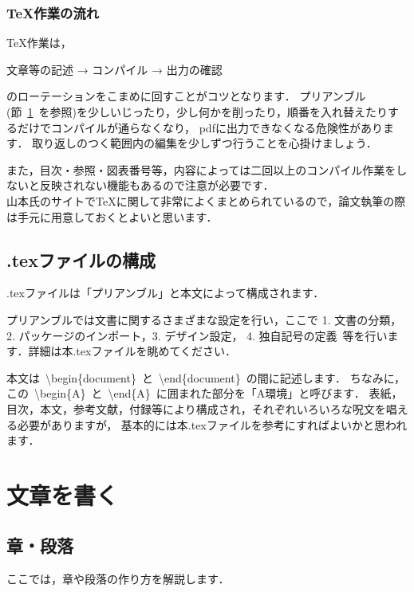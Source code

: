 \documentclass[11pt,a4j,onecolumn]{jsreport} %
\begin{document}
\subsection{TeX作業の流れ}

TeX作業は，
\begin{center}
  文章等の記述 → コンパイル → 出力の確認
\end{center}
のローテーションをこまめに回すことがコツとなります．
プリアンブル(節~\ref{sec:texfile}~を参照)を少しいじったり，少し何かを削ったり，順番を入れ替えたりするだけでコンパイルが通らなくなり，
pdfに出力できなくなる危険性があります．
取り返しのつく範囲内の編集を少しずつ行うことを心掛けましょう．


また，目次・参照・図表番号等，内容によっては二回以上のコンパイル作業をしないと反映されない機能もあるので注意が必要です．\\

山本氏のサイト\cite{yamamotoHP}で\TeX に関して非常によくまとめられているので，論文執筆の際は手元に用意しておくとよいと思います．

\section{.texファイルの構成}
\label{sec:texfile}

.texファイルは「プリアンブル」と本文によって構成されます．

プリアンブルでは文書に関するさまざまな設定を行い，ここで 1. 文書の分類，2. パッケージのインポート，3. デザイン設定，
4. 独自記号の定義~等を行います．詳細は本.texファイルを眺めてください．

本文は~\textbackslash begin\{document\}~と~\textbackslash end\{document\}~の間に記述します．
ちなみに，この~\textbackslash begin\{A\}~と~\textbackslash end\{A\}~に囲まれた部分を「A環境」と呼びます．
表紙，目次，本文，参考文献，付録等により構成され，それぞれいろいろな呪文を唱える必要がありますが，
基本的には本.texファイルを参考にすればよいかと思われます．


\chapter{文章を書く}

\section{章・段落}
ここでは，章や段落の作り方を解説します．
\end{document}
